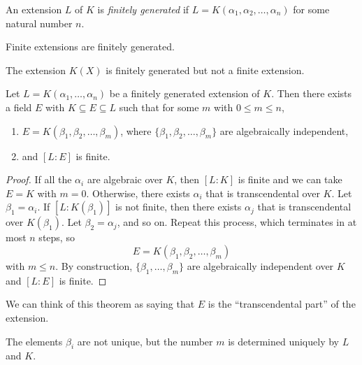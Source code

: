 \begin{definition}
  An extension $L$ of $K$ is \emph{finitely generated}
  if $L = K(\alpha_1, \alpha_2, \dots, \alpha_n)$ for
  some natural number $n$.
\end{definition}

\begin{example}
  Finite extensions are finitely generated.
\end{example}

\begin{example}
  The extension $K(X)$ is finitely generated but not
  a finite extension.
\end{example}

\begin{theorem}
  \label{thm:transcendental-part}
  Let $L = K(\alpha_1, \dots, \alpha_n)$ be a finitely
  generated extension of $K$. Then there exists a field
  $E$ with $K \subseteq E \subseteq L$ such that for
  some $m$ with $0 \le m \le n$,
  \begin{enumerate}
    \item $E = K(\beta_1, \beta_2, \dots, \beta_m)$,
      where $\{\beta_1, \beta_2, \dots, \beta_m\}$ are
      algebraically independent,
    \item and $[L : E]$ is finite.
  \end{enumerate}
\end{theorem}

\begin{proof}
  If all the $\alpha_i$ are algebraic over $K$, then
  $[L : K]$ is finite and we can take $E = K$ with
  $m = 0$. Otherwise, there exists $\alpha_i$ that is
  transcendental over $K$. Let $\beta_1 = \alpha_i$.
  If $[L : K(\beta_1)]$ is not finite, then there exists
  $\alpha_j$ that is transcendental over $K(\beta_1)$.
  Let $\beta_2 = \alpha_j$, and so on. Repeat this
  process, which terminates in at most $n$ steps, so
  \[
    E = K(\beta_1, \beta_2, \dots, \beta_m)
  \]
  with $m \le n$. By construction, $\{\beta_1, \dots, \beta_m\}$
  are algebraically independent over $K$ and
  $[L : E]$ is finite.
\end{proof}

\begin{remark}
  We can think of this theorem as saying that $E$ is
  the ``transcendental part'' of the extension.
\end{remark}

\begin{remark}
  The elements $\beta_i$ are not unique, but the number
  $m$ is determined uniquely by $L$ and $K$.
\end{remark}
